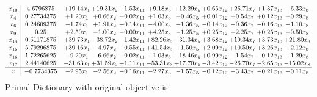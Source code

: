 \documentclass[9pt]{article}
\begin{document}
\[\begin{array}{c| c c@{\hskip 2pt} c@{\hskip 2pt} c@{\hskip 2pt} c@{\hskip 2pt} c@{\hskip 2pt} c@{\hskip 2pt} c@{\hskip 2pt} c@{\hskip 2pt} c@{\hskip 2pt} }
 x_{10}   &  4.6796875 & + 19.14 x_{1} & + 19.31 x_{2} & +  1.53 x_{11} & +  9.18 x_{3} & + 12.29 x_{5} & +  0.65 x_{12} & + 26.71 x_{7} & +  1.37 x_{13} & -6.33 x_{8}\\
 x_{4}   &  0.27734375 & +  1.20 x_{1} & +  0.66 x_{2} & +  0.02 x_{11} & +  1.03 x_{3} & +  0.46 x_{5} & +  0.01 x_{12} & +  0.54 x_{7} & +  0.12 x_{13} & -0.29 x_{8}\\
 x_{6}   &  0.24609375 & -1.74 x_{1} & +  1.91 x_{2} & +  0.14 x_{11} & -4.00 x_{3} & +  1.36 x_{5} & -0.14 x_{12} & -0.36 x_{7} & -0.16 x_{13} & -1.10 x_{8}\\
 x_{9}   &  0.25 & +  2.50 x_{1} & -1.00 x_{2} & -0.00 x_{11} & +  4.25 x_{3} & -1.25 x_{5} & +  0.25 x_{12} & +  2.25 x_{7} & +  0.25 x_{13} & +  0.50 x_{8}\\
 x_{14}   &  0.51171875 & + 39.73 x_{1} & -38.72 x_{2} & -1.42 x_{11} & + 82.26 x_{3} & -31.34 x_{5} & +  3.68 x_{12} & + 19.34 x_{7} & +  3.73 x_{13} & + 21.80 x_{8}\\
 x_{15}   &  5.79296875 & + 39.16 x_{1} & -4.97 x_{2} & -0.55 x_{11} & + 41.54 x_{3} & +  1.50 x_{5} & +  2.09 x_{12} & + 10.50 x_{7} & +  3.26 x_{13} & +  2.12 x_{8}\\
 x_{16}   &  1.72265625 & -9.20 x_{1} & -6.66 x_{2} & -0.02 x_{11} & -1.03 x_{3} & -18.46 x_{5} & +  0.99 x_{12} & -1.54 x_{7} & -0.12 x_{13} & +  1.29 x_{8}\\
 x_{17}   &  2.44140625 & -31.63 x_{1} & + 31.59 x_{2} & +  1.11 x_{11} & -53.31 x_{3} & + 17.70 x_{5} & -3.42 x_{12} & -26.70 x_{7} & -2.65 x_{13} & -15.02 x_{8}\\
\hline
z    &  -0.7734375 & -2.95 x_{1} & -2.56 x_{2} & -0.16 x_{11} & -2.27 x_{3} & -1.57 x_{5} & -0.12 x_{12} & -3.43 x_{7} & -0.21 x_{13} & -0.11 x_{8}\\
\end{array}\]
Primal Dictionary with original objective is:
\end{document}

